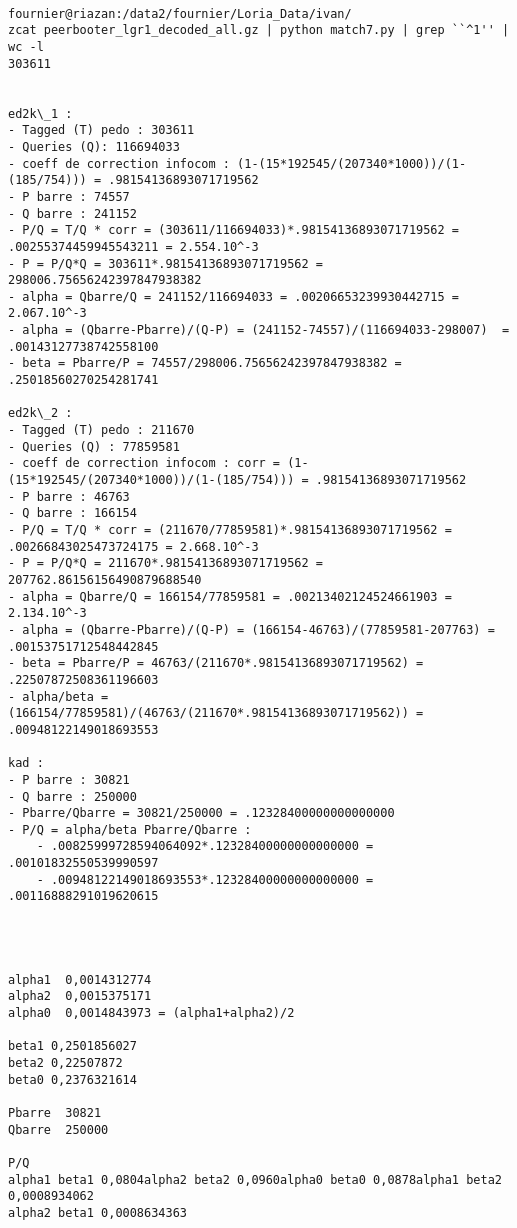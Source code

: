 \documentclass[a4paper,oneside,12pt]{article}
\begin{document}
\begin{reference}
  \begin{verbatim}

fournier@riazan:/data2/fournier/Loria_Data/ivan/
zcat peerbooter_lgr1_decoded_all.gz | python match7.py | grep ``^1'' | wc -l 
303611


ed2k\_1 :
- Tagged (T) pedo : 303611
- Queries (Q): 116694033
- coeff de correction infocom : (1-(15*192545/(207340*1000))/(1-(185/754))) = .98154136893071719562
- P barre : 74557
- Q barre : 241152
- P/Q = T/Q * corr = (303611/116694033)*.98154136893071719562 = .00255374459945543211 = 2.554.10^-3
- P = P/Q*Q = 303611*.98154136893071719562 = 298006.75656242397847938382
- alpha = Qbarre/Q = 241152/116694033 = .00206653239930442715 = 2.067.10^-3
- alpha = (Qbarre-Pbarre)/(Q-P) = (241152-74557)/(116694033-298007)  = .00143127738742558100
- beta = Pbarre/P = 74557/298006.75656242397847938382 = .25018560270254281741

ed2k\_2 :
- Tagged (T) pedo : 211670
- Queries (Q) : 77859581
- coeff de correction infocom : corr = (1-(15*192545/(207340*1000))/(1-(185/754))) = .98154136893071719562
- P barre : 46763 
- Q barre : 166154
- P/Q = T/Q * corr = (211670/77859581)*.98154136893071719562 = .00266843025473724175 = 2.668.10^-3
- P = P/Q*Q = 211670*.98154136893071719562 = 207762.86156156490879688540
- alpha = Qbarre/Q = 166154/77859581 = .00213402124524661903 = 2.134.10^-3
- alpha = (Qbarre-Pbarre)/(Q-P) = (166154-46763)/(77859581-207763) = .00153751712548442845
- beta = Pbarre/P = 46763/(211670*.98154136893071719562) = .22507872508361196603
- alpha/beta = (166154/77859581)/(46763/(211670*.98154136893071719562)) = .00948122149018693553

kad :
- P barre : 30821
- Q barre : 250000
- Pbarre/Qbarre = 30821/250000 = .12328400000000000000 
- P/Q = alpha/beta Pbarre/Qbarre :
    - .00825999728594064092*.12328400000000000000 = .00101832550539990597 
    - .00948122149018693553*.12328400000000000000 = .00116888291019620615




alpha1  0,0014312774
alpha2  0,0015375171
alpha0  0,0014843973 = (alpha1+alpha2)/2

beta1 0,2501856027
beta2 0,22507872
beta0 0,2376321614

Pbarre  30821
Qbarre  250000

P/Q
alpha1 beta1 0,0804alpha2 beta2 0,0960alpha0 beta0 0,0878alpha1 beta2 0,0008934062
alpha2 beta1 0,0008634363



  \end{verbatim}
\end{reference}
\end{document}
